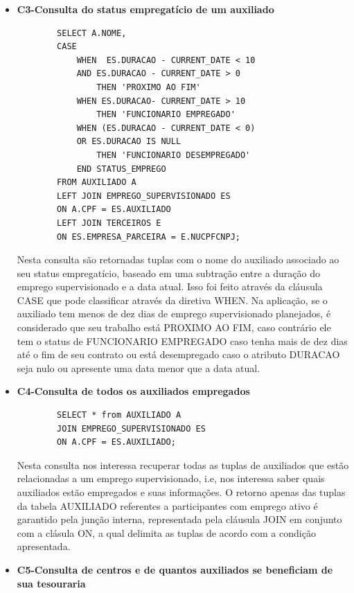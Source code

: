 \begin{itemize}
    \item \textbf{C3-Consulta do status empregatício de um auxiliado} 
    
    \begin{lstlisting}
        SELECT A.NOME,
        CASE 
            WHEN  ES.DURACAO - CURRENT_DATE < 10 
            AND ES.DURACAO - CURRENT_DATE > 0
                THEN 'PROXIMO AO FIM'
            WHEN ES.DURACAO- CURRENT_DATE > 10 
                THEN 'FUNCIONARIO EMPREGADO'
            WHEN (ES.DURACAO - CURRENT_DATE < 0) 
            OR ES.DURACAO IS NULL
                THEN 'FUNCIONARIO DESEMPREGADO'
            END STATUS_EMPREGO
        FROM AUXILIADO A
        LEFT JOIN EMPREGO_SUPERVISIONADO ES
        ON A.CPF = ES.AUXILIADO
        LEFT JOIN TERCEIROS E
        ON ES.EMPRESA_PARCEIRA = E.NUCPFCNPJ;
    \end{lstlisting}

    Nesta consulta são retornadas tuplas com o nome do auxiliado associado ao seu status empregatício, baseado em uma subtração entre a duração do emprego supervisionado e a data atual. Isso foi feito através da cláusula CASE que pode classificar através da diretiva WHEN. Na aplicação, se o auxiliado tem menos de dez dias de emprego supervisionado planejados, é considerado que seu trabalho está PROXIMO AO FIM, caso contrário ele tem o status de FUNCIONARIO EMPREGADO caso tenha mais de dez dias até o fim de seu contrato ou está desempregado caso o atributo DURACAO seja nulo ou apresente uma data menor que a data atual.

    \item \textbf{C4-Consulta de todos os auxiliados empregados}

    \begin{lstlisting}
        SELECT * from AUXILIADO A
        JOIN EMPREGO_SUPERVISIONADO ES
        ON A.CPF = ES.AUXILIADO;
    \end{lstlisting}

    Nesta consulta nos interessa recuperar todas as tuplas de auxiliados que estão relacionadas a um emprego supervisionado, i.e, nos interessa saber quais auxiliados estão empregados e suas informações. O retorno apenas das tuplas da tabela AUXILIADO referentes a participantes com emprego ativo é garantido pela junção interna, representada pela cláusula JOIN em conjunto com a clásula ON, a qual delimita as tuplas de acordo com a condição apresentada. 

    \item \textbf{C5-Consulta de centros e de quantos auxiliados se beneficiam de sua tesouraria}


\end{itemize}
